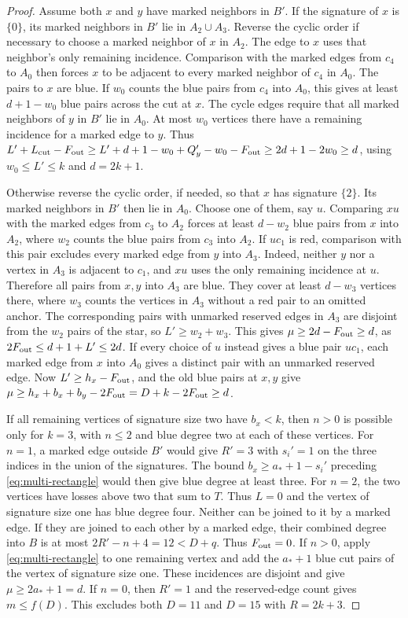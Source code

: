 \documentclass[preprint,11pt,numbers]{elsarticle-arxiv}
\numberwithin{equation}{section}
\theoremstyle{definition}
\begin{document}
\begin{proof}
Assume both $x$ and $y$ have marked neighbors in $B'$.
If the signature of $x$ is $\{0\}$, its marked neighbors
in $B'$ lie in $A_2\cup A_3$. Reverse the cyclic order if
necessary to choose a marked neighbor of $x$ in $A_2$.
The edge to $x$ uses that neighbor's only remaining incidence.
Comparison with the marked edges from $c_4$ to $A_0$ then
forces $x$ to be adjacent to every marked neighbor of $c_4$
in $A_0$. The pairs to $x$ are blue. If $w_0$ counts the blue
pairs from $c_4$ into $A_0$, this gives at least $d+1-w_0$
blue pairs across the cut at $x$. The cycle edges require
that all marked neighbors of $y$ in $B'$ lie in $A_0$.
At most $w_0$ vertices there have a remaining incidence for
a marked edge to $y$. Thus
$L'+L_{\rm cut}-F_{\rm out}\ge L'+d+1-w_0+Q_y'-w_0-F_{\rm out}\ge2d+1-2w_0\ge d$,
using $w_0\le L'\le k$ and $d=2k+1$.

Otherwise reverse the cyclic order, if needed, so that $x$
has signature $\{2\}$. Its marked neighbors in $B'$ then
lie in $A_0$. Choose one of them, say $u$. Comparing $xu$
with the marked edges from $c_3$ to $A_2$ forces at least
$d-w_2$ blue pairs from $x$ into $A_2$, where $w_2$ counts
the blue pairs from $c_3$ into $A_2$. If $uc_1$ is red,
comparison with this pair excludes every marked edge from
$y$ into $A_3$. Indeed, neither $y$ nor a vertex in $A_3$
is adjacent to $c_1$, and $xu$ uses the only remaining
incidence at $u$.
Therefore all pairs from $x,y$ into $A_3$ are blue. They
cover at least $d-w_3$ vertices there, where $w_3$ counts the
vertices in $A_3$ without a red pair to an omitted anchor.
The corresponding pairs with unmarked reserved edges in $A_3$ are disjoint
from the $w_2$ pairs of the star, so $L'\ge w_2+w_3$.
This gives $\mu\ge 2d-F_{\rm out}\ge d$, as $2F_{\rm out}\le d+1+L'\le2d$.
If every choice of $u$ instead gives a blue pair $uc_1$,
each marked edge from $x$ into $A_0$ gives a distinct
pair with an unmarked reserved edge. Now $L'\ge h_x-F_{\rm out}$,
and the old blue pairs
at $x,y$ give $\mu\ge h_x+b_x+b_y-2F_{\rm out}=D+k-2F_{\rm out}\ge d$.

If all remaining vertices of signature size two have $b_x<k$,
then $n>0$ is possible only for $k=3$, with $n\le2$ and
blue degree two at each of these vertices. For $n=1$,
a marked edge outside $B'$ would give $R'=3$ with $s_i'=1$
on the three indices in the union of the signatures. The bound
$b_x\ge a_*+1-s_i'$ preceding \eqref{eq:multi-rectangle}
would then give blue degree at least three. For $n=2$, the
two vertices have losses above two that sum to $T$. Thus
$L=0$ and the vertex of signature size one has blue degree four.
Neither can be joined to it by a marked edge. If they are joined
to each other by a marked edge, their combined degree into $B$
is at most $2R'-n+4=12<D+q$. Thus $F_{\rm out}=0$.
If $n>0$, apply \eqref{eq:multi-rectangle} to one remaining
vertex and add the $a_*+1$ blue cut pairs of the vertex of
signature size one. These incidences are disjoint and give
$\mu\ge2a_*+1=d$. If $n=0$, then $R'=1$ and the reserved-edge
count gives $m\le f(D)$. This excludes both $D=11$ and $D=15$
with $R=2k+3$.


\end{proof}
\end{document}
